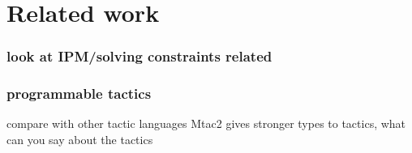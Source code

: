 \chapter{Related work}
\label{cha:related-work}



\subsection{look at IPM/solving constraints related}

\subsection{programmable tactics}

compare with other tactic languages
Mtac2 gives stronger types to tactics, what can you say about the tactics